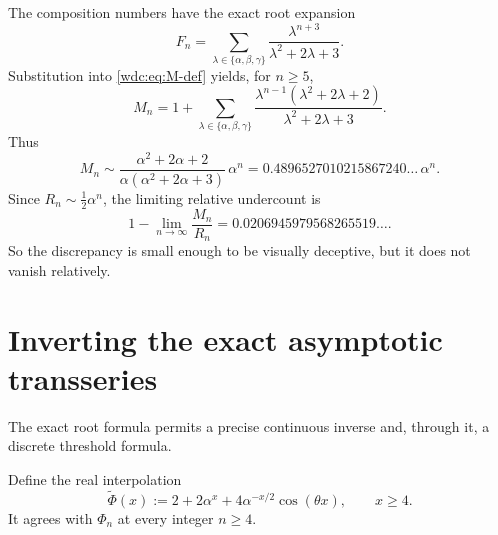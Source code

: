 \documentclass[11pt,letterpaper]{article}
\numberwithin{equation}{section}
\theoremstyle{definition}
\begin{document}
The composition numbers have the exact root expansion
\begin{equation}\label{wdc:eq:F-root-expansion}
  F_n=\sum_{\lambda\in\{\alpha,\beta,\gamma\}}
  \frac{\lambda^{n+3}}{\lambda^2+2\lambda+3}.
\end{equation}
Substitution into \eqref{wdc:eq:M-def} yields, for $n\ge5$,
\begin{equation}\label{wdc:eq:M-root-expansion}
 M_n=1+\sum_{\lambda\in\{\alpha,\beta,\gamma\}}
 \frac{\lambda^{n-1}(\lambda^2+2\lambda+2)}
      {\lambda^2+2\lambda+3}.
\end{equation}
Thus
\begin{equation}\label{wdc:eq:M-asymptotic}
 M_n\sim
 \frac{\alpha^2+2\alpha+2}
      {\alpha(\alpha^2+2\alpha+3)}\,\alpha^n
 =0.4896527010215867240\dots\,\alpha^n.
\end{equation}
Since $R_n\sim\frac12\alpha^n$, the limiting relative undercount is
\begin{equation}\label{wdc:eq:relative-undercount}
  1-\lim_{n\to\infty}\frac{M_n}{R_n}
  =0.0206945979568265519\dots.
\end{equation}
So the discrepancy is small enough to be visually deceptive, but it does not
vanish relatively.

\section{Inverting the exact asymptotic transseries}\label{wdc:sec:inverse}

The exact root formula permits a precise continuous inverse and, through it,
a discrete threshold formula.

Define the real interpolation
\begin{equation}\label{wdc:eq:continuous-Phi}
  \widetilde\Phi(x)
  :=2+2\alpha^x+4\alpha^{-x/2}\cos(\theta x),
  \qquad x\ge4.
\end{equation}
It agrees with $\Phi_n$ at every integer $n\ge4$.
\end{document}
